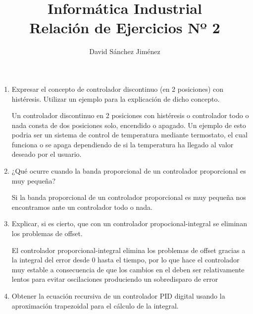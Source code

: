 \documentclass[10pt,a4paper,spanish]{article}
\begin{document}
  \setcounter{section}{0}
  \title{\huge\bf Informática Industrial \\ Relación de Ejercicios Nº 2}
  \author{\large David Sánchez Jiménez}
  \maketitle
  \vspace{3cm}

  \begin{enumerate}
    \item Expresar el concepto de controlador discontinuo (en 2 posiciones) con histéresis. Utilizar un ejemplo para la explicación de dicho concepto.

    \noindent
    Un controlador discontinuo en 2 posiciones con histéresis o controlador todo o nada consta de dos posiciones solo, encendido o apagado. Un ejemplo de esto podria ser un sistema de control de temperatura mediante termostato, el cual funciona o se apaga dependiendo de si la temperatura ha llegado al valor deseado por el usuario.

    \item ¿Qué ocurre cuando la banda proporcional de un controlador proporcional es muy pequeña?

    \noindent
    Si la banda proporcional de un controlador proporcional es muy pequeña nos encontramos ante un controlador todo o nada.

    \item Explicar, si es cierto, que con un controlador propocional-integral se eliminan los problemas de offset.

    \noindent
    El controlador proporcional-integral elimina los problemas de offset gracias a la integral del error desde 0 hasta el tiempo, por lo que hace el controlador muy estable a consecuencia de que los cambios en el deben ser relativamente lentos para evitar oscilaciones produciendo un sobredisparo de error

    \item Obtener la ecuación recursiva de un controlador PID digital usando la aproximación trapezoidal para el cálculo de la integral.


\end{enumerate}
\end{document}
